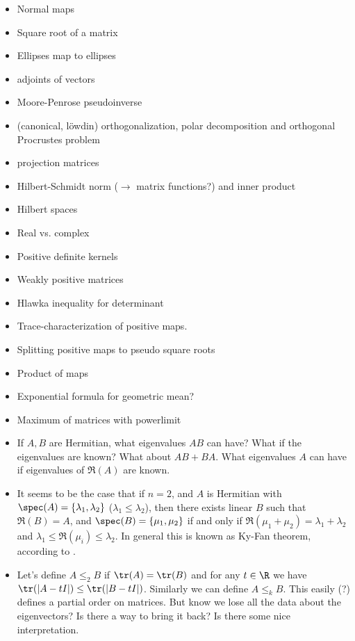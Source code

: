 \begin{itemize}
	\item Normal maps
	\item Square root of a matrix
	\item Ellipses map to ellipses
	\item adjoints of vectors
	\item Moore-Penrose pseudoinverse
	\item (canonical, löwdin) orthogonalization, polar decomposition and orthogonal Procrustes problem
	\item projection matrices
	\item Hilbert-Schmidt norm ($\to$ matrix functions?) and inner product
	\item Hilbert spaces
	\item Real vs. complex
	\item Positive definite kernels
	\item Weakly positive matrices
	\item Hlawka inequality for determinant %
	\item Trace-characterization of positive maps.
	\item Splitting positive maps to pseudo square roots
	\item Product of maps
	\item Exponential formula for geometric mean?
	\item Maximum of matrices with powerlimit
	\item If $A, B$ are Hermitian, what eigenvalues $AB$ can have? What if the eigenvalues are known? What about $AB + BA$. What eigenvalues $A$ can have if eigenvalues of $\Re(A)$ are known.
	\item It seems to be the case that if $n = 2$, and $A$ is Hermitian with $\spec(A) = \{\lambda_{1}, \lambda_{2}\}$ ($\lambda_{1} \leq \lambda_{2}$), then there exists linear $B$ such that $\Re(B) = A$, and $\spec(B) = \{\mu_{1}, \mu_{2} \}$ if and only if $\Re(\mu_{1} + \mu_{2}) = \lambda_{1} + \lambda_{2}$ and $\lambda_{1} \leq \Re(\mu_{i}) \leq \lambda_{2}$. In general this is known as Ky-Fan theorem, according to \cite{Ando3}.
	\item Let's define $A \leq_{2} B$ if $\tr(A) = \tr(B)$ and for any $t \in \R$ we have $\tr(|A - t I|) \leq \tr(|B - t I|)$. Similarly we can define $A \leq_{k} B$. This easily (?) defines a partial order on matrices. But know we lose all the data about the eigenvectors? Is there a way to bring it back? Is there some nice interpretation.

\end{itemize}
